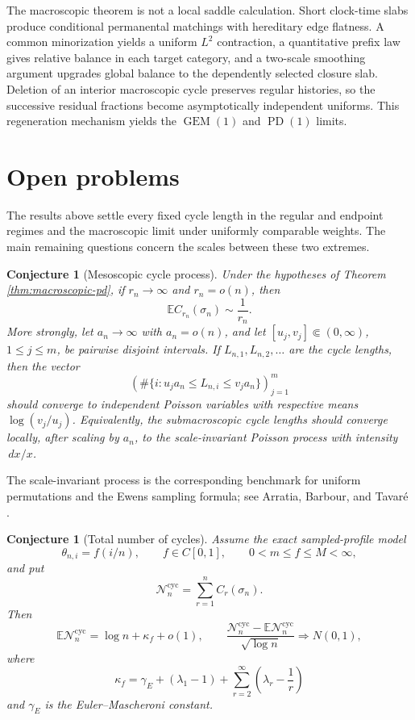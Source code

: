 \documentclass[11pt]{article}
\newtheorem{conjecture}[theorem]{Conjecture}
\theoremstyle{remark}
\newcommand{\Ee}{\mathbb E}
\newcommand{\dd}{\,d}
\begin{document}
The macroscopic theorem is not a local saddle calculation.  Short clock-time
slabs produce conditional permanental matchings with hereditary edge flatness.
A common minorization yields a uniform $L^2$ contraction, a quantitative prefix
law gives relative balance in each target category, and a two-scale smoothing
argument upgrades global balance to the dependently selected closure slab.
Deletion of an interior macroscopic cycle preserves regular histories, so the
successive residual fractions become asymptotically independent uniforms.  This
regeneration mechanism yields the $\operatorname{GEM}(1)$ and
$\operatorname{PD}(1)$ limits.

\section{Open problems}\label{sec:conjectures}

The results above settle every fixed cycle length in the regular and endpoint
regimes and the macroscopic limit under uniformly comparable weights.  The main
remaining questions concern the scales between these two extremes.

\begin{conjecture}[Mesoscopic cycle process]\label{conj:mesoscopic-cycles}
Under the hypotheses of Theorem \ref{thm:macroscopic-pd}, if
$r_n\to\infty$ and $r_n=o(n)$, then
\[
        \Ee C_{r_n}(\sigma_n)\sim\frac1{r_n}.
\]
More strongly, let $a_n\to\infty$ with $a_n=o(n)$, and let
$[u_j,v_j]\Subset(0,\infty)$, $1\le j\le m$, be pairwise disjoint intervals.
If $L_{n,1},L_{n,2},\ldots$ are the cycle lengths, then the vector
\[
        \left(
        \#\{i:u_ja_n\le L_{n,i}\le v_ja_n\}
        \right)_{j=1}^m
\]
should converge to independent Poisson variables with respective means
$\log(v_j/u_j)$.  Equivalently, the submacroscopic cycle lengths should converge
locally, after scaling by $a_n$, to the scale-invariant Poisson process with
intensity $\dd x/x$.
\end{conjecture}

The scale-invariant process is the corresponding benchmark for uniform
permutations and the Ewens sampling formula; see Arratia, Barbour, and Tavar\'e
\cite{ABT1992}.

\begin{conjecture}[Total number of cycles]\label{conj:total-cycles}
Assume the exact sampled-profile model
\[
        \theta_{n,i}=f(i/n),\qquad
        f\in C[0,1],\qquad 0<m\le f\le M<\infty,
\]
and put
\[
        \mathscr N_n^{\mathrm{cyc}}
        =\sum_{r=1}^n C_r(\sigma_n).
\]
Then
\[
        \Ee\mathscr N_n^{\mathrm{cyc}}
        =\log n+\kappa_f+o(1),
        \qquad
        \frac{\mathscr N_n^{\mathrm{cyc}}
        -\Ee\mathscr N_n^{\mathrm{cyc}}}{\sqrt{\log n}}
        \Rightarrow N(0,1),
\]
where
\[
        \kappa_f
        =\gamma_{\!E}+(\lambda_1-1)
        +\sum_{r=2}^\infty
        \left(\lambda_r-\frac1r\right)
\]
and $\gamma_E$ is the Euler--Mascheroni constant.
\end{conjecture}
\end{document}
